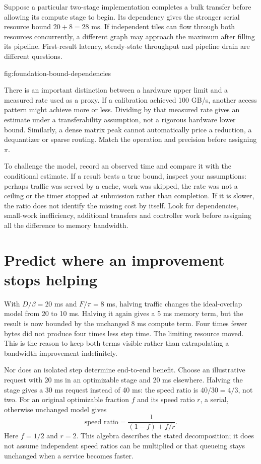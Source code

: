 Suppose a particular two-stage implementation completes a bulk transfer
before allowing its compute stage to begin. Its dependency gives the
stronger serial resource bound $20+8=28$ ms. If independent tiles can
flow through both resources concurrently, a different graph may approach
the maximum after filling its pipeline. First-result latency, steady-state
throughput and pipeline drain are different questions.

{fig:foundation-bound-dependencies}

There is an important distinction between a hardware upper limit and a
measured rate used as a proxy. If a calibration achieved 100 GB/s, another
access pattern might achieve more or less. Dividing by that measured rate
gives an estimate under a transferability assumption, not a rigorous
hardware lower bound. Similarly, a dense matrix peak cannot automatically
price a reduction, a dequantizer or sparse routing. Match the operation
and precision before assigning $\pi$.

To challenge the model, record an observed time and compare it with the
conditional estimate. If a result beats a true bound, inspect your assumptions:
perhaps traffic was served by a cache, work was skipped, the rate was not
a ceiling or the timer stopped at submission rather than completion.
If it is slower, the ratio does not identify the missing cost by itself.
Look for dependencies, small-work inefficiency, additional transfers and
controller work before assigning all the difference to memory bandwidth.

\section{Predict where an improvement stops helping}
With $D/\beta=20$ ms and $F/\pi=8$ ms, halving traffic changes the
ideal-overlap model from 20 to 10 ms. Halving it again gives a 5 ms
memory term, but the result is now bounded by the unchanged 8 ms compute
term. Four times fewer bytes did not produce four times less step time.
The limiting resource moved. This is the reason to keep both terms
visible rather than extrapolating a bandwidth improvement indefinitely.

Nor does an isolated step determine end-to-end benefit. Choose an
illustrative request with 20 ms in an optimizable stage and 20 ms elsewhere.
Halving the stage gives a 30 ms request instead of 40 ms:
the speed ratio is $40/30=4/3$, not two. For an original optimizable
fraction $f$ and its speed ratio $r$, a serial, otherwise unchanged model
gives
\[
 \text{speed ratio}=\frac{1}{(1-f)+f/r}.
\]
Here $f=1/2$ and $r=2$. This algebra describes the stated decomposition;
it does not assume independent speed ratios can be multiplied or that
queueing stays unchanged when a service becomes faster.

